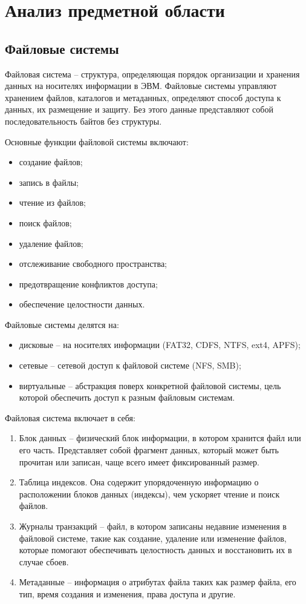 \section{Анализ предметной области}
\subsection{Файловые системы}

Файловая система -- структура, определяющая порядок организации и хранения данных на носителях информации в ЭВМ. Файловые системы управляют хранением файлов, каталогов и метаданных, определяют способ доступа к данных, их размещение и защиту. Без этого данные представляют собой последовательность байтов без структуры.

Основные функции файловой системы включают:

\begin{itemize}
\item создание файлов;
\item запись в файлы;
\item чтение из файлов;
\item поиск файлов;
\item удаление файлов;
\item отслеживание свободного пространства;
\item предотвращение конфликтов доступа;
\item обеспечение целостности данных.
\end{itemize}

Файловые системы делятся на:

\begin{itemize}
\item дисковые -- на носителях информации (FAT32, CDFS, NTFS, ext4, APFS);
\item сетевые -- сетевой доступ к файловой системе (NFS, SMB);
\item виртуальные -- абстракция поверх конкретной файловой системы, цель которой обеспечить доступ к разным файловым системам.
\end{itemize}

Файловая система включает в себя:

\begin{enumerate}
\item Блок данных -- физический блок информации, в котором хранится файл или его часть. Представляет собой фрагмент данных, который может быть прочитан или записан, чаще всего имеет фиксированный размер.
\item Таблица индексов. Она содержит упорядоченную информацию о расположении блоков данных (индексы), чем ускоряет чтение и поиск файлов.
\item Журналы транзакций -- файл, в котором записаны недавние изменения в файловой системе, такие как создание, удаление или изменение файлов, которые помогают обеспечивать целостность данных и восстановить их в случае сбоев.
\item Метаданные -- информация о атрибутах файла таких как размер файла, его тип, время создания и изменения, права доступа и другие.
\end{enumerate}

